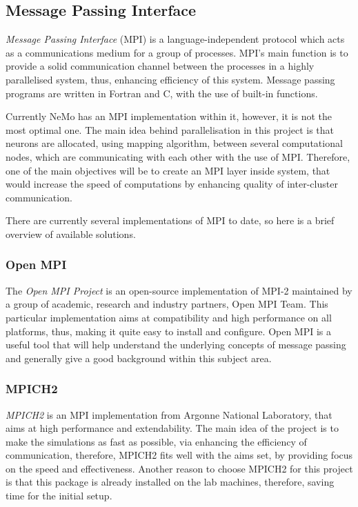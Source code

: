 \documentclass[12pt]{report}
\begin{document}
\subsection{Message Passing Interface}

\emph{Message Passing Interface} (MPI) is a language-independent protocol which acts as a communications medium for a group of processes.\cite{mpi} MPI's main function is to provide
a solid communication channel between the processes in a highly parallelised system, thus, enhancing efficiency of this system. Message passing programs are written in Fortran and 
C, with the use of built-in functions.

Currently NeMo has an MPI implementation within it, however, it is not the most optimal one. The main idea behind parallelisation in this project is that neurons are allocated, 
using mapping algorithm, between several computational nodes, which are communicating with each other with the use of MPI. Therefore, one of the main objectives will be to 
create an MPI layer inside system, that would increase the speed of computations by enhancing quality of inter-cluster communication.

There are currently several implementations of MPI to date, so here is a brief overview of available solutions.

\subsubsection{Open MPI}

The \emph{Open MPI Project} is an open-source implementation of MPI-2 maintained by a group of academic, research and industry partners, Open MPI Team.\cite{RichardL.Graham2005} This particular 
implementation aims at compatibility and high performance on all platforms, thus, making it quite easy to install and configure. Open MPI is a useful tool that will help understand 
the underlying concepts of message passing and generally give a good background within this subject area.

\subsubsection{MPICH2}

\emph{MPICH2} is an MPI implementation from Argonne National Laboratory, that aims at high performance and extendability.\cite{W.Gropp1999} The main idea of the project is to make the simulations as
fast as possible, via enhancing the efficiency of communication, therefore, MPICH2 fits well with the aims set, by providing focus on the speed and effectiveness. Another reason to choose 
MPICH2 for this project is that this package is already installed on the lab machines, therefore, saving time for the initial setup.\cite{W.Gropp1999a}
\end{document}
